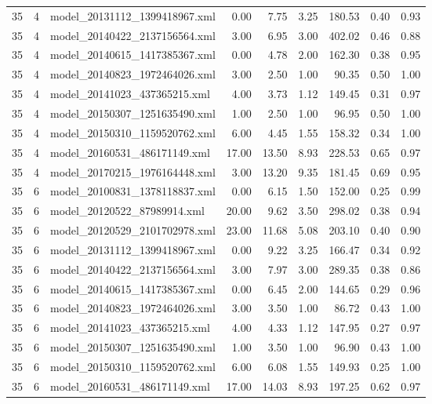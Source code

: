 \begin{table}[ht]
\begin{tabular}{rrlrrrrrr}
   35 &   4 & model\_20131112\_1399418967.xml & 0.00 & 7.75 & 3.25 & 180.53 & 0.40 & 0.93 \\ 
   35 &   4 & model\_20140422\_2137156564.xml & 3.00 & 6.95 & 3.00 & 402.02 & 0.46 & 0.88 \\ 
   35 &   4 & model\_20140615\_1417385367.xml & 0.00 & 4.78 & 2.00 & 162.30 & 0.38 & 0.95 \\ 
   35 &   4 & model\_20140823\_1972464026.xml & 3.00 & 2.50 & 1.00 & 90.35 & 0.50 & 1.00 \\ 
   35 &   4 & model\_20141023\_437365215.xml & 4.00 & 3.73 & 1.12 & 149.45 & 0.31 & 0.97 \\ 
   35 &   4 & model\_20150307\_1251635490.xml & 1.00 & 2.50 & 1.00 & 96.95 & 0.50 & 1.00 \\ 
   35 &   4 & model\_20150310\_1159520762.xml & 6.00 & 4.45 & 1.55 & 158.32 & 0.34 & 1.00 \\ 
   35 &   4 & model\_20160531\_486171149.xml & 17.00 & 13.50 & 8.93 & 228.53 & 0.65 & 0.97 \\ 
   35 &   4 & model\_20170215\_1976164448.xml & 3.00 & 13.20 & 9.35 & 181.45 & 0.69 & 0.95 \\ 
   35 &   6 & model\_20100831\_1378118837.xml & 0.00 & 6.15 & 1.50 & 152.00 & 0.25 & 0.99 \\ 
   35 &   6 & model\_20120522\_87989914.xml & 20.00 & 9.62 & 3.50 & 298.02 & 0.38 & 0.94 \\ 
   35 &   6 & model\_20120529\_2101702978.xml & 23.00 & 11.68 & 5.08 & 203.10 & 0.40 & 0.90 \\ 
   35 &   6 & model\_20131112\_1399418967.xml & 0.00 & 9.22 & 3.25 & 166.47 & 0.34 & 0.92 \\ 
   35 &   6 & model\_20140422\_2137156564.xml & 3.00 & 7.97 & 3.00 & 289.35 & 0.38 & 0.86 \\ 
   35 &   6 & model\_20140615\_1417385367.xml & 0.00 & 6.45 & 2.00 & 144.65 & 0.29 & 0.96 \\ 
   35 &   6 & model\_20140823\_1972464026.xml & 3.00 & 3.50 & 1.00 & 86.72 & 0.43 & 1.00 \\ 
   35 &   6 & model\_20141023\_437365215.xml & 4.00 & 4.33 & 1.12 & 147.95 & 0.27 & 0.97 \\ 
   35 &   6 & model\_20150307\_1251635490.xml & 1.00 & 3.50 & 1.00 & 96.90 & 0.43 & 1.00 \\ 
   35 &   6 & model\_20150310\_1159520762.xml & 6.00 & 6.08 & 1.55 & 149.93 & 0.25 & 1.00 \\ 
   35 &   6 & model\_20160531\_486171149.xml & 17.00 & 14.03 & 8.93 & 197.25 & 0.62 & 0.97 \\ 

\end{tabular}
\end{table}
